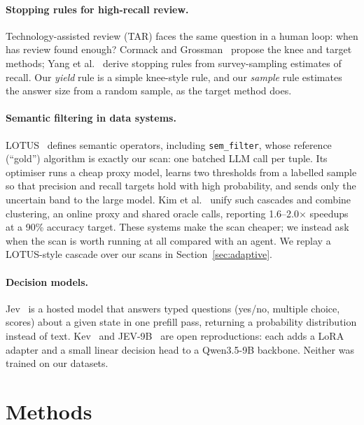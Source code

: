 \documentclass[11pt]{article}
\begin{document}
\paragraph{Stopping rules for high-recall review.}
Technology-assisted review (TAR) faces the same question in a human loop:
when has review found enough? Cormack and Grossman~\cite{cormack2016tar}
propose the knee and target methods; Yang et al.~\cite{yang2021stopping}
derive stopping rules from survey-sampling estimates of recall. Our
\emph{yield} rule is a simple knee-style rule, and our \emph{sample} rule
estimates the answer size from a random sample, as the target method does.

\paragraph{Semantic filtering in data systems.}
LOTUS~\cite{patel2024lotus} defines semantic operators, including
\texttt{sem\_filter}, whose reference (``gold'') algorithm is exactly our scan:
one batched LLM call per tuple. Its optimiser runs a cheap proxy model, learns
two thresholds from a labelled sample so that precision and recall targets
hold with high probability, and sends only the uncertain band to the large
model. Kim et al.~\cite{kim2026semfilter} unify such cascades and combine
clustering, an online proxy and shared oracle calls, reporting 1.6--2.0$\times$
speedups at a 90\% accuracy target. These systems make the scan cheaper; we
instead ask when the scan is worth running at all compared with an agent. We
replay a LOTUS-style cascade over our scans in Section~\ref{sec:adaptive}.

\paragraph{Decision models.}
Jev~\cite{typesafe_jev} is a hosted model that answers typed questions (yes/no,
multiple choice, scores) about a given state in one prefill pass, returning a
probability distribution instead of text. Kev~\cite{kev} and
JEV-9B~\cite{jev9b} are open reproductions: each adds a LoRA adapter and a small
linear decision head to a Qwen3.5-9B backbone. Neither was trained on our
datasets.

\section{Methods}
\end{document}

